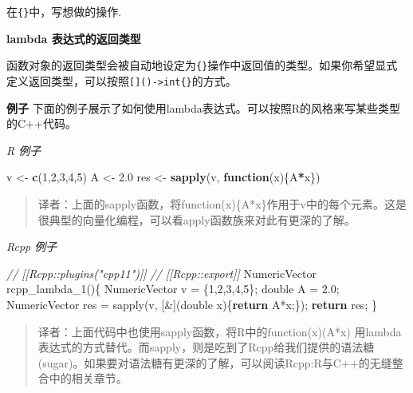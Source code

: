 \documentclass[]{ctexbook}
\newenvironment{Shaded}{\begin{snugshade}}{\end{snugshade}}
\newcommand{\KeywordTok}[1]{\textcolor[rgb]{0.13,0.29,0.53}{\textbf{#1}}}
\newcommand{\DataTypeTok}[1]{\textcolor[rgb]{0.13,0.29,0.53}{#1}}
\newcommand{\DecValTok}[1]{\textcolor[rgb]{0.00,0.00,0.81}{#1}}
\newcommand{\FloatTok}[1]{\textcolor[rgb]{0.00,0.00,0.81}{#1}}
\newcommand{\StringTok}[1]{\textcolor[rgb]{0.31,0.60,0.02}{#1}}
\newcommand{\CommentTok}[1]{\textcolor[rgb]{0.56,0.35,0.01}{\textit{#1}}}
\newcommand{\ControlFlowTok}[1]{\textcolor[rgb]{0.13,0.29,0.53}{\textbf{#1}}}
\newcommand{\OperatorTok}[1]{\textcolor[rgb]{0.81,0.36,0.00}{\textbf{#1}}}
\newcommand{\NormalTok}[1]{#1}
\begin{document}
在\texttt{\{\}}中，写想做的操作.

\textbf{lambda 表达式的返回类型}

函数对象的返回类型会被自动地设定为\texttt{\{\}}操作中返回值的类型。如果你希望显式定义返回类型，可以按照\texttt{{[}{]}()-\textgreater{}int\{\}}的方式。

\textbf{例子}
下面的例子展示了如何使用lambda表达式。可以按照R的风格来写某些类型的C++代码。

\emph{R 例子}

\begin{Shaded}
\begin{Highlighting}[]
\NormalTok{v <-}\StringTok{ }\KeywordTok{c}\NormalTok{(}\DecValTok{1}\NormalTok{,}\DecValTok{2}\NormalTok{,}\DecValTok{3}\NormalTok{,}\DecValTok{4}\NormalTok{,}\DecValTok{5}\NormalTok{)}
\NormalTok{A <-}\StringTok{ }\FloatTok{2.0}
\NormalTok{res <-}
\StringTok{  }\KeywordTok{sapply}\NormalTok{(v, }\ControlFlowTok{function}\NormalTok{(x)\{A}\OperatorTok{*}\NormalTok{x\})}
\end{Highlighting}
\end{Shaded}

\begin{quote}
译者：上面的sapply函数，将function(x)\{A*x\}作用于v中的每个元素。这是很典型的向量化编程，可以看apply函数族来对此有更深的了解。
\end{quote}

\emph{Rcpp 例子}

\begin{Shaded}
\begin{Highlighting}[]
\CommentTok{// [[Rcpp::plugins("cpp11")]] }
\CommentTok{// [[Rcpp::export]]}
\NormalTok{NumericVector rcpp_lambda_1()\{}
\NormalTok{  NumericVector v = \{}\DecValTok{1}\NormalTok{,}\DecValTok{2}\NormalTok{,}\DecValTok{3}\NormalTok{,}\DecValTok{4}\NormalTok{,}\DecValTok{5}\NormalTok{\};}
  \DataTypeTok{double}\NormalTok{ A = }\FloatTok{2.0}\NormalTok{;}
\NormalTok{  NumericVector res =}
\NormalTok{    sapply(v, [&](}\DataTypeTok{double}\NormalTok{ x)\{}\ControlFlowTok{return}\NormalTok{ A*x;\});}
  \ControlFlowTok{return}\NormalTok{ res;}
\NormalTok{\}}
\end{Highlighting}
\end{Shaded}

\begin{quote}
译者：上面代码中也使用sapply函数，将R中的function(x)(A*x)
用lambda表达式的方式替代。而sapply，则是吃到了Rcpp给我们提供的语法糖(sugar)。如果要对语法糖有更深的了解，可以阅读Rcpp:R与C++的无缝整合中的相关章节。
\end{quote}
\end{document}
